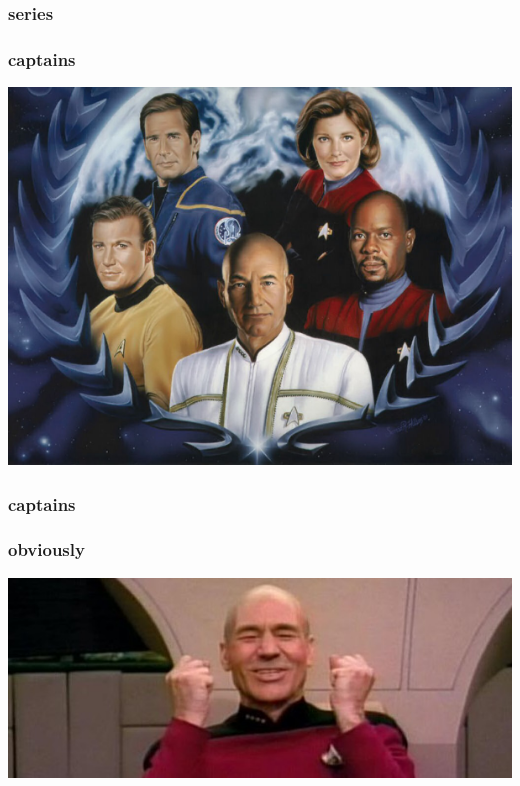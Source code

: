\documentclass{beamer}
\begin{document}
\begin{frame}
  \frametitle{series}
  
\end{frame}

\begin{frame}
  \frametitle{captains}
  \includegraphics[height = 0.8\textheight, keepaspectratio = true]{figure/Star-Trek-Captains}
\end{frame}

\begin{frame}
  \frametitle{captains}
  
\end{frame}

\begin{frame}
  \frametitle{obviously}
  \includegraphics[width = \textwidth, keepaspectratio = true]{figure/win}
\end{frame}
\end{document}
